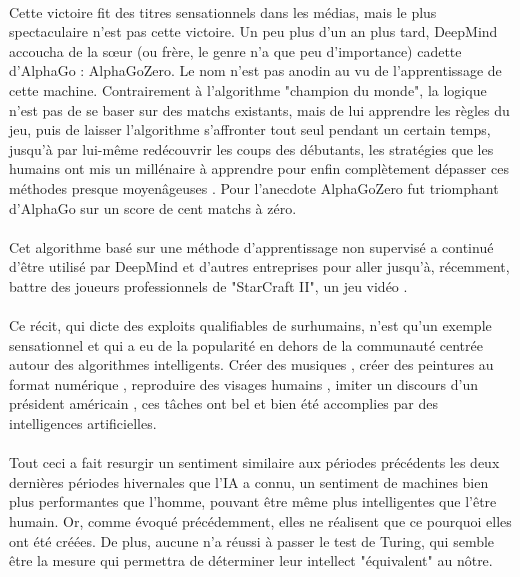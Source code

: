 \documentclass[10pt, french, a4paper]{report}
\begin{document}
\paragraph{}
Cette victoire fit des titres sensationnels dans les médias, mais le plus spectaculaire n’est pas cette victoire. Un peu plus d’un an plus tard, DeepMind accoucha de la sœur (ou frère, le genre n’a que peu d’importance) cadette d’AlphaGo : AlphaGoZero. Le nom n’est pas anodin au vu de l’apprentissage de cette machine. Contrairement à l’algorithme "champion du monde", la logique n’est pas de se baser sur des matchs existants, mais de lui apprendre les règles du jeu, puis de laisser l’algorithme s’affronter tout seul pendant un certain temps, jusqu’à par lui-même redécouvrir les coups des débutants, les stratégies que les humains ont mis un millénaire à apprendre pour enfin complètement dépasser ces méthodes presque moyenâgeuses \citep{silver_mastering_2017}. Pour l’anecdote AlphaGoZero fut triomphant d’AlphaGo sur un score de cent matchs à zéro.

\paragraph{}
Cet algorithme basé sur une méthode d’apprentissage non supervisé a continué d’être utilisé par DeepMind et d’autres entreprises pour aller jusqu’à, récemment, battre des joueurs professionnels de "StarCraft II", un jeu vidéo \citep{vinyals_alphastar:_2019}.

\paragraph{}
Ce récit, qui dicte des exploits qualifiables de surhumains, n’est qu’un exemple sensationnel et qui a eu de la popularité en dehors de la communauté centrée autour des algorithmes intelligents. Créer des musiques \citep{medeot_structurenet:_2018}, créer des peintures au format numérique \citep{mordvintsev_inceptionism:_2015}, reproduire des visages humains \citep{karras_style-based_2018}, imiter un discours d’un président américain \citep{suwajanakorn_synthesizing_2017}, ces tâches ont bel et bien été accomplies par des intelligences artificielles.

\paragraph{}
Tout ceci a fait resurgir un sentiment similaire aux périodes précédents les deux dernières périodes hivernales que l’IA a connu, un sentiment de machines bien plus performantes que l’homme, pouvant être même plus intelligentes que l’être humain. Or, comme évoqué précédemment, elles ne réalisent que ce pourquoi elles ont été créées. De plus, aucune n’a réussi à passer le test de Turing, qui semble être la mesure qui permettra de déterminer leur intellect "équivalent" au nôtre.
\end{document}
